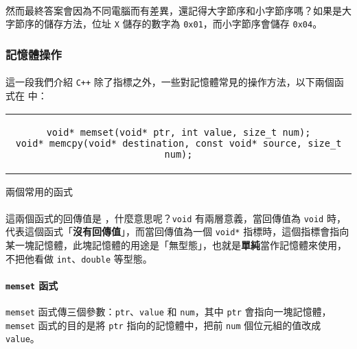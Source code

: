 \documentclass[12pt,a4paper,oneside]{article}
\begin{document}
\begin{CJK}{UTF8}{bkai}
\paragraph{}然而最終答案會因為不同電腦而有差異，還記得大字節序和小字節序嗎？如果是大字節序的儲存方法，位址 \lstinline!X! 儲存的數字為 \texttt{0x01}，而小字節序會儲存 \texttt{0x04}。

\subsubsection{記憶體操作}

\paragraph{}這一段我們介紹 \texttt{C++} 除了指標之外，一些對記憶體常見的操作方法，以下兩個函式在  中：

\begin{code}[h!]
\centering
\begin{tabular}{c}
\begin{lstlisting}
void* memset(void* ptr, int value, size_t num);
void* memcpy(void* destination, const void* source, size_t num);
\end{lstlisting}
\end{tabular}
\caption{兩個常用的函式}
\label{program:struct:code:memory:function}
\end{code}

\paragraph{}這兩個函式的回傳值是 ，什麼意思呢？\lstinline!void! 有兩層意義，當回傳值為 \lstinline!void! 時，代表這個函式「{\color{red}\textbf{沒有回傳值}}」，而當回傳值為一個 \lstinline!void*! 指標時，這個指標會指向某一塊記憶體，此塊記憶體的用途是「無型態」，也就是\textbf{單純}當作記憶體來使用，不把他看做 \lstinline!int!、\lstinline!double! 等型態。

\paragraph{\lstinline!memset! 函式}\lstinline!memset! 函式傳三個參數：\lstinline!ptr!、\lstinline!value! 和 \lstinline!num!，其中 \lstinline!ptr! 會指向一塊記憶體，\lstinline!memset! 函式的目的是將 \lstinline!ptr! 指向的記憶體中，把前 \lstinline!num! 個位元組的值改成 \lstinline!value!。


\end{CJK}
\end{document}
